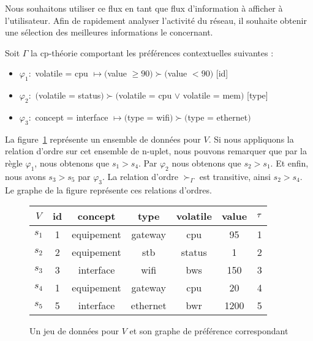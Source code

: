 Nous souhaitons utiliser ce flux en tant que flux d'information à afficher à l'utilisateur. Afin de rapidement analyser l'activité du réseau, il souhaite obtenir une sélection des meilleures informations le concernant.

Soit $\Gamma$ la cp-théorie comportant les préférences contextuelles suivantes :
\begin{itemize}
	\item $\varphi_1 : $ volatile = cpu $\mapsto ($value $ \geq 90) \succ ($value $ < 90)$ [id]
	\item $\varphi_2 : $ $($volatile = status$) \succ ($volatile = cpu $ \vee $ volatile = mem$)$ [type]
	\item $\varphi_3 : $ concept = interface $\mapsto ($type = wifi$) \succ ($type = ethernet$)$
\end{itemize}

La figure~\ref{fig:valid:domvision:architecture:pref} représente un ensemble de données pour $V$. Si nous appliquons la relation d'ordre sur cet ensemble de n-uplet, nous pouvons remarquer que par la règle $\varphi_1$, nous obtenons que $s_1 > s_4$. Par $\varphi_2$ nous obtenons que $s_2 > s_1$. Et enfin, nous avons $s_3 > s_5$ par $\varphi_3$. La relation d'ordre $\succ_\Gamma$ est transitive, ainsi $s_2 > s_4$. Le graphe de la figure représente ces relations d'ordres.
\begin{figure}[ht]\centering
\begin{tabular}{|c|c|c|c|c|c|c|} \bottomrule
\rowcolor{hypcolor} $V$ & id & concept & type & volatile & value & $\tau$\\ \hline
$s_1$ & 1 & equipement & gateway & cpu & 95 & 1\\ \hline %
$s_2$ & 2 & equipement & stb & status & 1 & 2\\ \hline %
$s_3$ & 3 & interface & wifi & bws & 150 & 3\\ \hline %
$s_4$ & 1 & equipement & gateway & cpu & 20 & 4\\ \hline
$s_5$ & 5 & interface & ethernet & bwr & 1200 & 5\\ \toprule %
\end{tabular}\hspace{1cm}
\begin{minipage}{3cm}
\end{minipage}
\caption{Un jeu de données pour $V$ et son graphe de préférence correspondant}\label{fig:valid:domvision:architecture:pref}
\end{figure}

